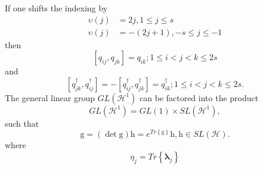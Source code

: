 \documentclass[aps,preprint]{revtex4}%
\begin{document}
If one shifts the indexing by
\begin{align}
\upsilon\left(  j\right)   &  =2j,1\leq j\leq s\\
\upsilon\left(  j\right)   &  =-\left(  2j+1\right)  ,-s\leq j\leq-1
\end{align}
then%
\begin{equation}
\left[  q_{ij},q_{jk}\right]  =q_{ik};1\leq i<j<k\leq2s
\end{equation}
and
\begin{equation}
\left[  q_{jk}^{\dagger},q_{ij}^{\dagger}\right]  =-\left[  q_{ij}^{\dagger
},q_{jk}^{\dagger}\right]  =q_{ik}^{\dagger};1\leq i<j<k\leq2s.
\end{equation}
The general linear group $GL\left(  \mathcal{H}^{1}\right)  $ can be factored
into the product%
\begin{equation}
GL\left(  \mathcal{H}^{1}\right)  =GL\left(  1\right)  \times SL\left(
\mathcal{H}^{1}\right)  ,
\end{equation}
such that
\begin{equation}
\mathrm{g}=\left(  \mathrm{\det g}\right)  \mathrm{h}=e^{Tr\left\{
\mathrm{g}\right\}  }\mathrm{h,h\in}SL\left(  \mathcal{H}\right)  .
\end{equation}
where
\begin{equation}
\eta_{j}=Tr\left\{  \mathbf{\lambda}_{j}\right\}
\end{equation}


\section{}
\end{document}
